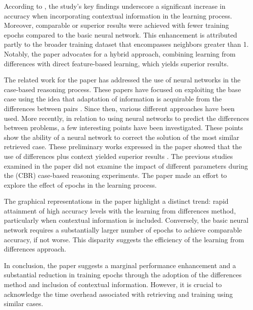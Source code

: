 \documentclass[a4paper, 12pt]{report}
\begin{document}
According to \cite{learningFromDifferences2022}, the study's key findings underscore a significant increase in accuracy when incorporating contextual information in the learning process.
Moreover, comparable or superior results were achieved with fewer training epochs compared to the basic neural network.
This enhancement is attributed partly to the broader training dataset that encompasses neighbors greater than 1.
Notably, the paper advocates for a hybrid approach, combining learning from differences with direct feature-based learning, which yields superior results.

The related work for the paper \cite{learningFromDifferences2022} has addressed the use of neural networks in the case-based reasoning process.
These papers have focused on exploiting the base case using the idea that adaptation of information is acquirable from the differences between pairs \cite{hanney1996learning}.
Since then, various different approaches have been used. More recently, in relation to using neural networks to predict the differences between problems,
a few interesting points have been investigated. These points show the ability of a neural network to correct the solution of the most similar retrieved case.
These preliminary works expressed in the paper showed that the use of differences plus context yielded superior results \cite{craw2006learning}.
The previous studies examined in the paper \cite{learningFromDifferences2022} did not examine the impact of different parameters during the (CBR) case-based reasoning experiments.
The paper \cite{learningFromDifferences2022} made an effort to explore the effect of epochs in the learning process.

The graphical representations in the paper highlight a distinct trend: rapid attainment of high accuracy levels with the learning from differences method,
particularly when contextual information is included. Conversely, the basic neural network requires a substantially larger number of epochs to achieve comparable accuracy,
if not worse. This disparity suggests the efficiency of the learning from differences approach.

In conclusion, the paper suggests a marginal performance enhancement and a substantial reduction in training epochs through the adoption of the differences method
and inclusion of contextual information. However, it is crucial to acknowledge the time overhead associated with retrieving and training using similar cases.
\end{document}
